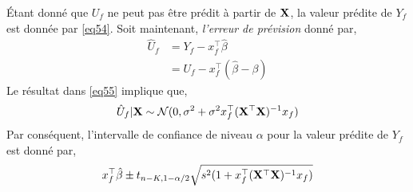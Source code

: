 \'Etant donné que $U_f$ ne peut pas être prédit à partir de $\mathbf X$, la valeur prédite de $Y_f$ est donnée par \eqref{eq54}. Soit maintenant, \emph{l'erreur de prévision} donné par,
\begin{align*}
\hat{U}_f &=Y_f -x_f^\top\hat{\beta}\\
&=U_f - x_f^\top(\hat{\beta}-\beta) 
\end{align*}
Le résultat dans \eqref{eq55} implique que,
\begin{align*}
\hat{U}_f | \mathbf X \sim \mathcal{N}(0, \sigma^2 + \sigma^2x_f^\top(\mathbf X^\top\mathbf X)^{-1}x_f)
\end{align*}
Par conséquent, l'intervalle de confiance de niveau $\alpha$ pour la valeur prédite de $Y_f$ est donné par,
\begin{align*}
x_f^\top\hat{\beta} \pm t_{n-K, 1-\alpha/2}\sqrt{s^2(1+x_f^\top (\mathbf X^\top\mathbf X)^{-1}x_f)}
\end{align*}



 

